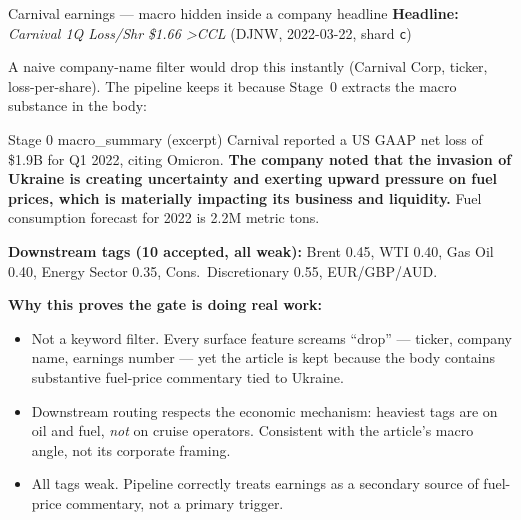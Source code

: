 \documentclass[10pt,aspectratio=169]{beamer}
\begin{document}
\begin{frame}[fragile]{Carnival earnings --- macro hidden inside a company headline}
  \scriptsize
  \textbf{Headline:} \emph{Carnival 1Q Loss/Shr \$1.66 \textgreater CCL} \hfill (DJNW, 2022-03-22, shard \texttt{c})

  \vspace{0.2em}
  A naive company-name filter would drop this instantly (Carnival Corp, ticker, loss-per-share).
  The pipeline keeps it because Stage~0 extracts the macro substance in the body:

  \vspace{0.3em}
  \begin{block}{Stage 0 macro\_summary (excerpt)}
    \scriptsize
    Carnival reported a US GAAP net loss of \$1.9B for Q1 2022, citing Omicron.
    \textbf{The company noted that the invasion of Ukraine is creating uncertainty and exerting
    upward pressure on fuel prices, which is materially impacting its business and liquidity.}
    Fuel consumption forecast for 2022 is 2.2M metric tons.
  \end{block}

  \vspace{0.3em}
  \textbf{Downstream tags (10 accepted, all weak):} Brent 0.45, WTI 0.40, Gas Oil 0.40, Energy
  Sector 0.35, Cons.\ Discretionary 0.55, EUR/GBP/AUD.

  \vspace{0.4em}
  \textcolor{goodgreen}{\textbf{Why this proves the gate is doing real work:}}
  \begin{itemize}\itemsep0.15em
    \item Not a keyword filter. Every surface feature screams ``drop'' --- ticker, company
          name, earnings number --- yet the article is kept because the body contains
          substantive fuel-price commentary tied to Ukraine.
    \item Downstream routing respects the economic mechanism: heaviest tags are on oil and
          fuel, \emph{not} on cruise operators. Consistent with the article's macro angle,
          not its corporate framing.
    \item All tags weak. Pipeline correctly treats earnings as a secondary source of
          fuel-price commentary, not a primary trigger.
  \end{itemize}
\end{frame}
\end{document}
